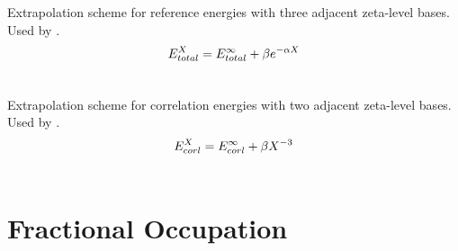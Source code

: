 \documentclass[letterpaper,10pt,english]{sphinxmanual}
\begin{document}

\begin{fulllineitems}
\label{index:wrappers.scf_xtpl_helgaker_3}
Extrapolation scheme for reference energies with three adjacent zeta-level bases.
Used by {\hyperref[index:wrappers.complete_basis_set]{}}.
\begin{gather}
\begin{split}E_{total}^X = E_{total}^{\infty} + \beta e^{-\alpha X}\end{split}\notag\\\begin{split}\end{split}\notag
\end{gather}
\end{fulllineitems}


\begin{fulllineitems}
\label{index:wrappers.corl_xtpl_helgaker_2}
Extrapolation scheme for correlation energies with two adjacent zeta-level bases.
Used by {\hyperref[index:wrappers.complete_basis_set]{}}.
\begin{gather}
\begin{split}E_{corl}^X = E_{corl}^{\infty} + \beta X^{-3}\end{split}\notag\\\begin{split}\end{split}\notag
\end{gather}
\end{fulllineitems}



\chapter{Fractional Occupation}
\label{index:fractional-occupation}\label{index:module-frac}

\begin{fulllineitems}
\label{index:frac.frac_nuke}
\end{fulllineitems}
\end{document}

